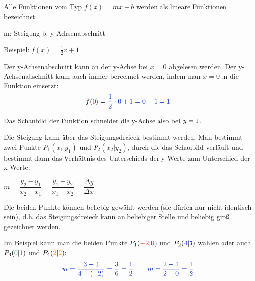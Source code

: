 
Alle Funktionen vom Typ \(f(x)=mx+b\) werden als lineare Funktionen bezeichnet.
\begin{tcolorbox}
	\centering\textcolor{loestc}{m: Steigung \qquad	b: y-Achsenabschnitt}
\end{tcolorbox}

Beispiel: \(f(x)=\frac{1}{2}x+1\)

%

\medskip

Der y-Achsenabschnitt kann an der y-Achse bei \(x=0\) abgelesen werden. Der y-Achsenabschnitt kann auch immer berechnet werden, indem man \(x=0\) in die Funktion einsetzt:
\begin{align*}
    f(\textcolor{red}{0})=\textcolor{loes}{\frac{1}{2}\cdot 0+1=0+1=1}
\end{align*}

Das Schaubild der Funktion schneidet die y-Achse also bei \(y=\textcolor{loes}{1}\)\textcolor{loes}{.}

Die Steigung kann über das Steigungsdreieck bestimmt werden. Man bestimmt zwei Punkte \(P_1(x_1|y_1)\) und \(P_2(x_2|y_2)\), durch die das Schaubild verläuft und bestimmt dann das Verhältnis des Unterschieds der y-Werte zum Unterschied der x-Werte:
\begin{tcolorbox}
	\centering\textcolor{loestc}{\(m=\dfrac{y_2-y_1}{x_2-x_1}=\dfrac{y_1-y_2}{x_1-x_2}=\dfrac{\Delta y}{\Delta x}\)}
\end{tcolorbox}
Die beiden Punkte können beliebig gewählt werden (sie dürfen nur nicht identisch sein), d.h. das Steigungsdreieck kann an beliebiger Stelle und beliebig groß gezeichnet werden.

Im Beispiel kann man die beiden Punkte \(P_1(\textcolor{red}{-2}|\textcolor{red}{0})\) und \(P_2(\textcolor{blue}{4}|\textcolor{blue}{3})\) wählen oder auch \(P_3(\textcolor{ForestGreen}{0}|\textcolor{ForestGreen}{1})\) und \(P_4(\textcolor{YellowOrange}{2}|\textcolor{YellowOrange}{2})\):
\begin{align*}
	\textcolor{loes}{m=\frac{3-0}{4-(-2)}=\frac{3}{6}=\frac{1}{2}
	\qquad
	m=\frac{2-1}{2-0}=\frac{1}{2}}
\end{align*}

